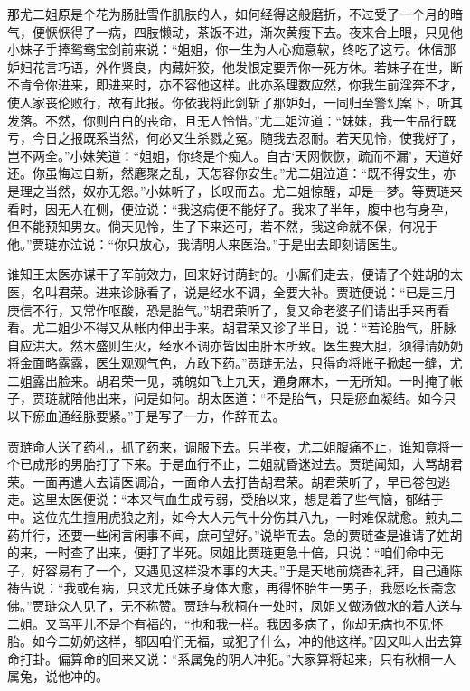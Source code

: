 那尤二姐原是个花为肠肚雪作肌肤的人，如何经得这般磨折，不过受了一个月的暗气，便恹恹得了一病，四肢懒动，茶饭不进，渐次黄瘦下去。夜来合上眼，只见他小妹子手捧鸳鸯宝剑前来说：``姐姐，你一生为人心痴意软，终吃了这亏。休信那妒妇花言巧语，外作贤良，内藏奸狡，他发恨定要弄你一死方休。若妹子在世，断不肯令你进来，即进来时，亦不容他这样。此亦系理数应然，你我生前淫奔不才，使人家丧伦败行，故有此报。你依我将此剑斩了那妒妇，一同归至警幻案下，听其发落。不然，你则白白的丧命，且无人怜惜。''尤二姐泣道：``妹妹，我一生品行既亏，今日之报既系当然，何必又生杀戮之冤。随我去忍耐。若天见怜，使我好了，岂不两全。''小妹笑道：``姐姐，你终是个痴人。自古`天网恢恢，疏而不漏'，天道好还。你虽悔过自新，然麀聚之乱，天怎容你安生。''尤二姐泣道：``既不得安生，亦是理之当然，奴亦无怨。''小妹听了，长叹而去。尤二姐惊醒，却是一梦。等贾琏来看时，因无人在侧，便泣说：``我这病便不能好了。我来了半年，腹中也有身孕，但不能预知男女。倘天见怜，生了下来还可，若不然，我这命就不保，何况于他。''贾琏亦泣说：``你只放心，我请明人来医治。''于是出去即刻请医生。

谁知王太医亦谋干了军前效力，回来好讨荫封的。小厮们走去，便请了个姓胡的太医，名叫君荣。进来诊脉看了，说是经水不调，全要大补。贾琏便说：``已是三月庚信不行，又常作呕酸，恐是胎气。''胡君荣听了，复又命老婆子们请出手来再看看。尤二姐少不得又从帐内伸出手来。胡君荣又诊了半日，说：``若论胎气，肝脉自应洪大。然木盛则生火，经水不调亦皆因由肝木所致。医生要大胆，须得请奶奶将金面略露露，医生观观气色，方敢下药。''贾琏无法，只得命将帐子掀起一缝，尤二姐露出脸来。胡君荣一见，魂魄如飞上九天，通身麻木，一无所知。一时掩了帐子，贾琏就陪他出来，问是如何。胡太医道：``不是胎气，只是瘀血凝结。如今只以下瘀血通经脉要紧。''于是写了一方，作辞而去。

贾琏命人送了药礼，抓了药来，调服下去。只半夜，尤二姐腹痛不止，谁知竟将一个已成形的男胎打了下来。于是血行不止，二姐就昏迷过去。贾琏闻知，大骂胡君荣。一面再遣人去请医调治，一面命人去打告胡君荣。胡君荣听了，早已卷包逃走。这里太医便说：``本来气血生成亏弱，受胎以来，想是着了些气恼，郁结于中。这位先生擅用虎狼之剂，如今大人元气十分伤其八九，一时难保就愈。煎丸二药并行，还要一些闲言闲事不闻，庶可望好。''说毕而去。急的贾琏查是谁请了姓胡的来，一时查了出来，便打了半死。凤姐比贾琏更急十倍，只说：``咱们命中无子，好容易有了一个，又遇见这样没本事的大夫。''于是天地前烧香礼拜，自己通陈祷告说：``我或有病，只求尤氏妹子身体大愈，再得怀胎生一男子，我愿吃长斋念佛。''贾琏众人见了，无不称赞。贾琏与秋桐在一处时，凤姐又做汤做水的着人送与二姐。又骂平儿不是个有福的，``也和我一样。我因多病了，你却无病也不见怀胎。如今二奶奶这样，都因咱们无福，或犯了什么，冲的他这样。''因又叫人出去算命打卦。偏算命的回来又说：``系属兔的阴人冲犯。''大家算将起来，只有秋桐一人属兔，说他冲的。

